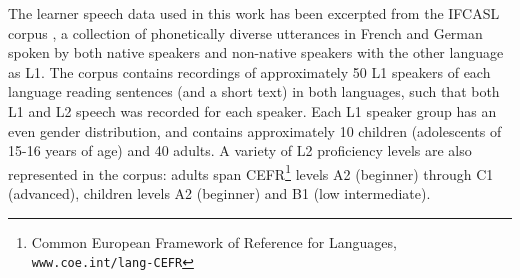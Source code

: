 \documentclass[a4paper]{article}
\newcommand{\TODO}[1]{{\color{red}\textbf{[TODO #1]}}}
\begin{document}
		The learner speech data used in this work has been excerpted from the IFCASL corpus 
		\cite{Fauth2014}, a collection of 
	phonetically diverse utterances in French and German spoken by both native speakers and non-native speakers with the other language as L1. 
	The corpus contains recordings of approximately 50 L1 speakers of each language reading 
	sentences (and a short text) in both languages, such that both L1 and L2 speech was recorded for each speaker. Each L1 speaker group has an even gender distribution, and contains approximately 10 children (adolescents of 15-16 years of age) and 40 adults. 
	A variety of L2 proficiency levels are also represented in the corpus: adults span CEFR\footnote{Common European Framework of Reference for Languages, \texttt{www.coe.int/lang-CEFR}} levels A2 (beginner) through C1 (advanced), children levels A2 (beginner) and B1 (low intermediate).
	
\end{document}
